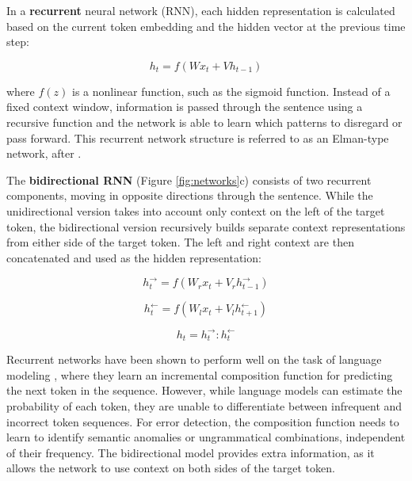 \documentclass[11pt]{article}
\begin{document}
In a \textbf{recurrent} neural network (RNN), each hidden representation is calculated based on the current token embedding and the hidden vector at the previous time step:

\begin{equation}
h_t = f(W x_t + V h_{t-1})
\end{equation} 

\noindent where $f(z)$ is a nonlinear function, such as the sigmoid function. 
Instead of a fixed context window, information is passed through the sentence using a recursive function and the network is able to learn which patterns to disregard or pass forward.
This recurrent network structure is referred to as an Elman-type network, after .


The \textbf{bidirectional RNN} (Figure \ref{fig:networks}c) consists of two recurrent components, moving in opposite directions through the sentence. While the unidirectional version takes into account only context on the left of the target token, the bidirectional version recursively builds separate context representations from either side of the target token. The left and right context are then concatenated and used as the hidden representation:

\begin{equation}
h_t^{\rightarrow} = f(W_r x_t + V_r h_{t-1}^{\rightarrow})
\end{equation} 

\begin{equation}
h_t^{\leftarrow} = f(W_l x_t + V_l h_{t+1}^{\leftarrow})
\end{equation} 

\begin{equation}
h_t = h_t^{\rightarrow} : h_t^{\leftarrow}
\end{equation} 



Recurrent networks have been shown to perform well on the task of language modeling \cite{Kombrinka,Chelba2014}, where they learn an incremental composition function for predicting the next token in the sequence. 
However, while language models can estimate the probability of each token, they are unable to differentiate between infrequent and incorrect token sequences.
For error detection, the composition function needs to learn to identify semantic anomalies or ungrammatical combinations, independent of their frequency.
The bidirectional model provides extra information, as it allows the network to use context on both sides of the target token.
\end{document}
